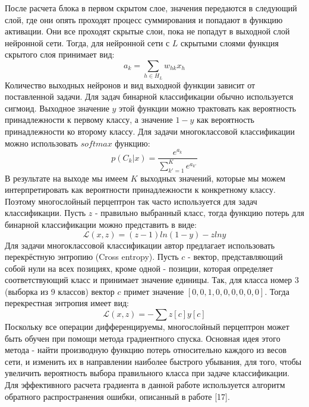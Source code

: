     После расчета блока в первом скрытом слое, значения передаются в следующий слой, где они опять проходят процесс суммирования и попадают в функцию активации. Они все проходят скрытые слои, пока не попадут в выходной слой нейронной сети. Тогда, для нейронной сети с $L$ скрытыми слоями функция скрытого слоя принимает вид:
    \begin{equation}
    a_{k}=\sum_{h\in  H_{L}}w_{hk}x_{h}
    \end{equation}
    Количество выходных нейронов и вид выходной функции зависит от поставленной задачи. Для задач бинарной классификации обычно используется сигмоид. Выходное значение $y$ этой функции можно трактовать как вероятность принадлежности к первому классу, а значение $1-y$ как вероятность принадлежности ко второму классу.
    Для задачи многоклассовой классификации можно использовать $softmax$ функцию:
    \begin{equation}
    p(C_{k}|x)=\frac{e^{a_{k}}}{\sum_{k{}'=1}^{K}e^{a_{k{}'}}}
    \end{equation}
    В результате на выходе мы имеем $K$ выходных значений, которые мы можем интерпретировать как вероятности принадлежности к конкретному классу. Поэтому многослойный перцептрон так часто используется для задач классификации. Пусть $z$ - правильно выбранный класс, тогда функцию потерь для бинарной классификации можно представить в виде:
    \begin{equation}
    \mathcal{L}(x,z) = (z-1)ln(1-y)-zlny
    \end{equation}
    Для задачи многоклассовой классификации автор предлагает использовать перекрёстную энтропию (Cross entropy). Пусть $c$ - вектор, представляющий собой нули на всех позициях, кроме одной - позиции, которая определяет соответствующий класс и принимает значение единицы. Так, для класса номер 3 (выборка из 9 классов) вектор $c$ примет значение $[0,0,1,0,0,0,0,0,0]$. Тогда перекрестная энтропия имеет вид:
    \begin{equation}
    \mathcal{L}(x,z) = -\sum{z[c] y[c]}
    \end{equation}
    Поскольку все операции дифференцируемы, многослойный перцептрон может быть обучен при помощи метода градиентного спуска. Основная идея этого метода - найти производную функцию потерь относительно каждого из весов сети, и изменить их в направлении наиболее быстрого убывания, для того, чтобы увеличить вероятность выбора правильного класса при задаче классификации. 
    Для эффективного расчета градиента в данной работе используется алгоритм обратного распространения ошибки, описанный в работе [17]. 

